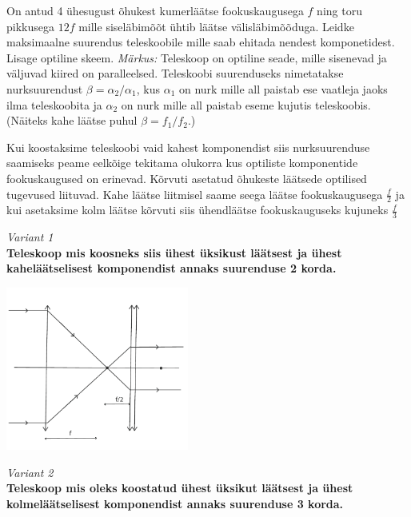 \setAuthor{}

On antud 4 ühesugust õhukest kumerläätse fookuskaugusega $f$ ning toru pikkusega $12f$ mille siseläbimõõt ühtib läätse välisläbimõõduga. Leidke maksimaalne suurendus teleskoobile mille saab ehitada nendest komponetidest. Lisage optiline skeem. 
\emph{Märkus:} Teleskoop on optiline seade, mille sisenevad ja väljuvad kiired on paralleelsed. Teleskoobi suurenduseks nimetatakse nurksuurendust $ \beta = {\alpha}_{2} / {\alpha}_{1}$, kus $\alpha_1$ on nurk mille all paistab ese vaatleja jaoks ilma teleskoobita ja $\alpha_2$ on nurk mille all paistab eseme kujutis teleskoobis. (Näiteks kahe läätse puhul $ \beta = f_1 / f_2 $.)



\hint

\solu
Kui koostaksime teleskoobi vaid kahest komponendist siis nurksuurenduse saamiseks peame eelkõige tekitama olukorra kus optiliste komponentide fookuskaugused on erinevad.
Kõrvuti asetatud õhukeste läätsede optilised tugevused liituvad. Kahe läätse liitmisel saame seega läätse fookuskaugusega $ \frac{f}{2} $ ja kui asetaksime kolm läätse kõrvuti siis ühendläätse fookuskauguseks kujuneks $ \frac{f}{3} $

\vspace{20pt}
\emph{Variant 1}\\
\textbf{Teleskoop mis koosneks siis ühest üksikust läätsest ja ühest kaheläätselisest komponendist annaks suurenduse 2 korda.}

\vspace{-10pt}
  \begin{center}
    \includegraphics[width=0.45\textwidth]{2020-v2g-10-yl1.pdf}
  \end{center}
  \vspace{-10pt}
  


\emph{Variant 2}\\
\textbf{Teleskoop mis oleks koostatud ühest üksikut läätsest ja ühest kolmeläätselisest komponendist annaks suurenduse 3 korda.}

